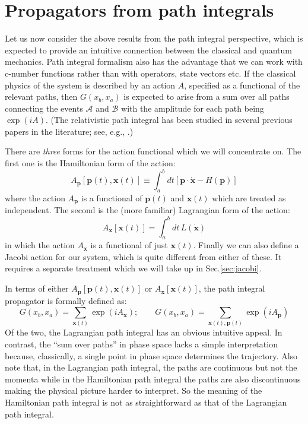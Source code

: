 \documentclass[12pt]{article}
\begin{document}
 
 \section{Propagators from path integrals}\label{sec:prfrpi}
 
 Let us now consider the above results from the path integral perspective, which is expected to provide an intuitive connection between the classical and quantum mechanics. Path integral formalism also has the advantage that we can work with c-number functions rather than with operators, state vectors etc.  If the classical physics of the system is described by an action $A$, specified as a functional of the relevant paths, then $G(x_b, x_a)$ is expected to arise  from a sum over all paths connecting the events $\mathcal{A}$ and $\mathcal{B}$ with the amplitude for each path being $\exp(iA)$. (The relativistic path integral has been studied in several previous papers in the literature; see, e.g., \cite{A,A1,A2,B,B2,B9,E,H,I}.)
 
 There are \textit{three}  forms for the action functional which we will concentrate on. The first one is the Hamiltonian form of the action:
 \begin{equation}
  A_{\bm{p}}[\bm{p}(t), \bm{x}(t)] \equiv \int_a^b dt [\bm{p \cdot \dot x} - H (\bm{p})]
 \end{equation} 
 where the action $A_{\bm{p}}$ is a functional of  $\bm{p}(t)$ and $\bm{x}(t)$ which are treated as independent. The second is the (more familiar) Lagrangian form of the action:
 \begin{equation}
A_{\bm{x}}[\bm{x}(t)] = \int_a^b dt \, L(\dot{\bm{x}})
\end{equation} 
 in which the action $A_{\bm{x}}$ is a functional of just $\bm{x}(t)$. Finally we can also define a Jacobi action for our system, which is quite different from either of these. It requires a separate treatment which we will take up in Sec.\ref{sec:jacobi}.
  
  In terms of either $A_{\bm{p}}[\bm{p}(t), \bm{x}(t)]$ or $A_{\bm{x}}[\bm{x}(t)]$,  the path integral propagator is formally defined as: 
 \begin{equation} 
G(x_b, x_a) = \sum_{\bm{x}(t)} \exp (iA_{\bm{x}});\qquad  G(x_b, x_a)= \sum_{\bm{x}(t), \bm{p}(t) }\exp(i A_{\bm{p}} )
 \end{equation}
 Of the two, the Lagrangian path integral has an obvious intuitive appeal.  In contrast, the ``sum over paths'' in phase space lacks a simple interpretation  because, classically, a single point in phase space determines the trajectory. Also note that, in the Lagrangian path integral, the paths are continuous but not the momenta while in the Hamiltonian path integral the paths are also discontinuous making the physical picture harder to interpret. So the meaning of the Hamiltonian path integral is not as straightforward as that of the Lagrangian path integral.
 
\end{document}

